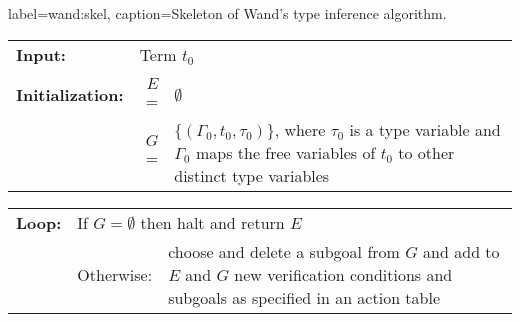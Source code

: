 \begin{taplfigureT}{label=wand:skel, caption={Skeleton of Wand's type inference algorithm.}}

\quad
\setlength{\tabcolsep}{2pt}
\begin{tabular}{l r p{7cm}}
\textbf{Input:}          & \multicolumn{2}{l}{Term $t_{0}$} \\
                         &            & \\
\textbf{Initialization:} & $E$ = & $\emptyset$ \\
                         & $G$ = & $\{ (\Gamma_{0},t_{0},\tau_{0}) \}$,
                                    where $\tau_{0}$ is a type variable
                                    and $\Gamma_{0}$ maps the free
                                    variables of $t_{0}$ to other distinct
                                    type variables \\
\end{tabular}

\quad
\setlength{\tabcolsep}{1pt}
\begin{tabular}{l l p{7cm}}
\textbf{Loop:} \quad\quad\quad\quad\quad
& \multicolumn{2}{l}{If $G = \emptyset$ then halt and return $E$} \\
	
& Otherwise: & choose and delete a subgoal from $G$ and add to $E$
               and $G$ new verification conditions and subgoals as
               specified in an action table \\
\end{tabular}

\end{taplfigureT}